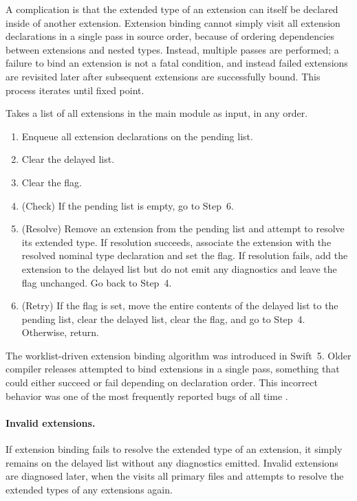 \documentclass[../generics]{subfiles}
\begin{document}
A complication is that the extended type of an extension can itself be declared inside of another extension. Extension binding cannot simply visit all extension declarations in a single pass in source order, because of ordering dependencies between extensions and nested types. Instead, multiple passes are performed; a failure to bind an extension is not a fatal condition, and instead failed extensions are revisited later after subsequent extensions are successfully bound. This process iterates until fixed point.
\begin{algorithm}\label{extension binding algorithm}
Takes a list of all extensions in the main module as input, in any order.
\begin{enumerate}
\item Enqueue all extension declarations on the pending list.
\item Clear the delayed list.
\item Clear the flag.
\item (Check) If the pending list is empty, go to Step~6.
\item (Resolve) Remove an extension from the pending list and attempt to resolve its extended type. If resolution succeeds, associate the extension with the resolved nominal type declaration and set the flag. If resolution fails, add the extension to the delayed list but do not emit any diagnostics and leave the flag unchanged. Go back to Step~4.
\item (Retry) If the flag is set, move the entire contents of the delayed list to the pending list, clear the delayed list, clear the flag, and go to Step~4. Otherwise, return.
\end{enumerate}
\end{algorithm}
The worklist-driven extension binding algorithm was introduced in Swift~5. Older compiler releases attempted to bind extensions in a single pass, something that could either succeed or fail depending on declaration order. This incorrect behavior was one of the most frequently reported bugs of all time \cite{sr631}.

\paragraph{Invalid extensions.} If extension binding fails to resolve the extended type of an extension, it simply remains on the delayed list without any diagnostics emitted. Invalid extensions are diagnosed later, when the  visits all primary files and attempts to resolve the extended types of any extensions again.
\end{document}
